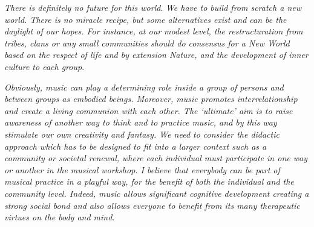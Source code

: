 \documentclass{article}
\begin{document}
\textit{There is definitely no future for this world}. \textit{We have to build from scratch a new world. There is no miracle recipe, but some alternatives exist} \textit{and can be the daylight of our hopes. 
For instance, at our modest level, the restructuration from tribes, clans or any small communities should do consensus for a New World based on the respect of life and by extension Nature, and the development of inner culture to each group}. 

\textit{Obviously, music can play a determining role inside a group of persons and between groups as embodied beings.
Moreover, music promotes interrelationship and create a living communion with each other.
The `ultimate' aim is to raise awareness of another way to think and to practice music, and by this way stimulate our own creativity and fantasy.
We need to consider the didactic approach which has to be designed to fit into a larger context such as a community or societal renewal, where each individual must participate in one way or another in the musical workshop. 
I believe that everybody can be part of musical practice in a playful way, for the benefit of  both the individual and the community level.
%  
Indeed, music allows significant cognitive development creating a strong social bond and also allows everyone to benefit from its many
therapeutic virtues on the body and mind}.
\end{document}

